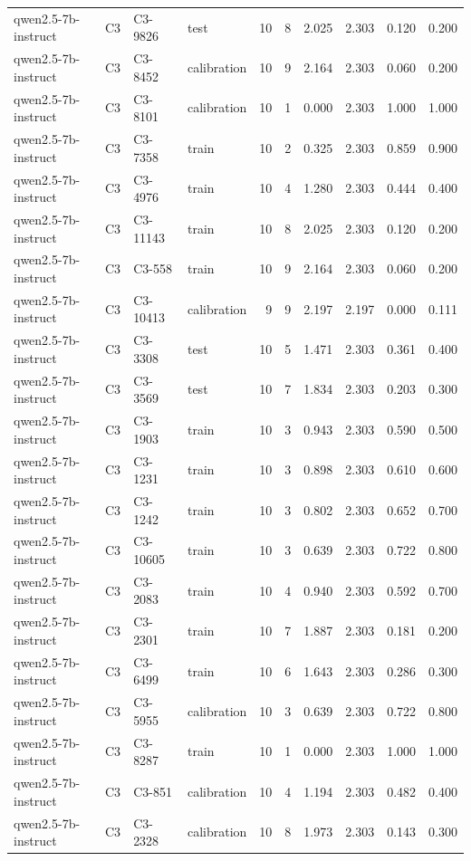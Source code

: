 \begin{table}
\begin{tabular}{llllrrrrrr}
qwen2.5-7b-instruct & C3 & C3-9826 & test & 10 & 8 & 2.025 & 2.303 & 0.120 & 0.200 \\
qwen2.5-7b-instruct & C3 & C3-8452 & calibration & 10 & 9 & 2.164 & 2.303 & 0.060 & 0.200 \\
qwen2.5-7b-instruct & C3 & C3-8101 & calibration & 10 & 1 & 0.000 & 2.303 & 1.000 & 1.000 \\
qwen2.5-7b-instruct & C3 & C3-7358 & train & 10 & 2 & 0.325 & 2.303 & 0.859 & 0.900 \\
qwen2.5-7b-instruct & C3 & C3-4976 & train & 10 & 4 & 1.280 & 2.303 & 0.444 & 0.400 \\
qwen2.5-7b-instruct & C3 & C3-11143 & train & 10 & 8 & 2.025 & 2.303 & 0.120 & 0.200 \\
qwen2.5-7b-instruct & C3 & C3-558 & train & 10 & 9 & 2.164 & 2.303 & 0.060 & 0.200 \\
qwen2.5-7b-instruct & C3 & C3-10413 & calibration & 9 & 9 & 2.197 & 2.197 & 0.000 & 0.111 \\
qwen2.5-7b-instruct & C3 & C3-3308 & test & 10 & 5 & 1.471 & 2.303 & 0.361 & 0.400 \\
qwen2.5-7b-instruct & C3 & C3-3569 & test & 10 & 7 & 1.834 & 2.303 & 0.203 & 0.300 \\
qwen2.5-7b-instruct & C3 & C3-1903 & train & 10 & 3 & 0.943 & 2.303 & 0.590 & 0.500 \\
qwen2.5-7b-instruct & C3 & C3-1231 & train & 10 & 3 & 0.898 & 2.303 & 0.610 & 0.600 \\
qwen2.5-7b-instruct & C3 & C3-1242 & train & 10 & 3 & 0.802 & 2.303 & 0.652 & 0.700 \\
qwen2.5-7b-instruct & C3 & C3-10605 & train & 10 & 3 & 0.639 & 2.303 & 0.722 & 0.800 \\
qwen2.5-7b-instruct & C3 & C3-2083 & train & 10 & 4 & 0.940 & 2.303 & 0.592 & 0.700 \\
qwen2.5-7b-instruct & C3 & C3-2301 & train & 10 & 7 & 1.887 & 2.303 & 0.181 & 0.200 \\
qwen2.5-7b-instruct & C3 & C3-6499 & train & 10 & 6 & 1.643 & 2.303 & 0.286 & 0.300 \\
qwen2.5-7b-instruct & C3 & C3-5955 & calibration & 10 & 3 & 0.639 & 2.303 & 0.722 & 0.800 \\
qwen2.5-7b-instruct & C3 & C3-8287 & train & 10 & 1 & 0.000 & 2.303 & 1.000 & 1.000 \\
qwen2.5-7b-instruct & C3 & C3-851 & calibration & 10 & 4 & 1.194 & 2.303 & 0.482 & 0.400 \\
qwen2.5-7b-instruct & C3 & C3-2328 & calibration & 10 & 8 & 1.973 & 2.303 & 0.143 & 0.300 \\

\end{tabular}
\end{table}

